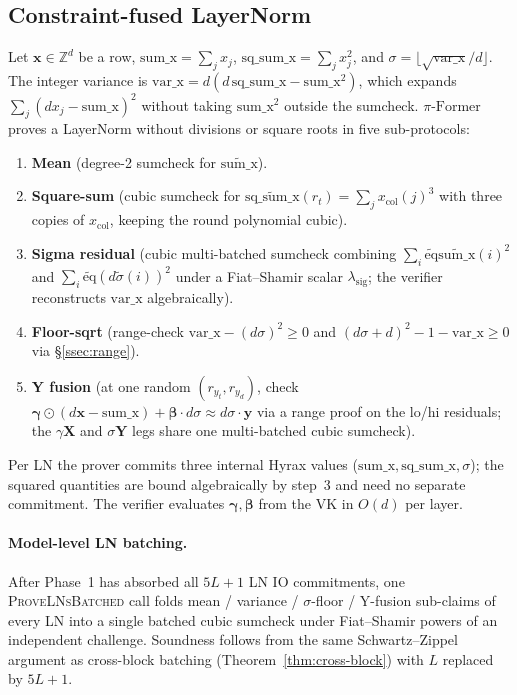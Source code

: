 \documentclass[letterpaper,twocolumn,10pt]{article}
\theoremstyle{remark}
\theoremstyle{definition}
\newcommand{\sys}{\ensuremath{\pi\text{-Former}}}
\newcommand{\ZZ}{\mathbb{Z}}
\newcommand{\bx}{\mathbf{x}}
\newcommand{\by}{\mathbf{y}}
\newcommand{\bX}{\mathbf{X}}
\newcommand{\bY}{\mathbf{Y}}
\newcommand{\bbeta}{\boldsymbol{\beta}}
\newcommand{\bgamma}{\boldsymbol{\gamma}}
\newcommand{\eq}{\widetilde{\mathrm{eq}}}
\begin{document}
\subsection{Constraint-fused LayerNorm}
\label{ssec:ln}
Let $\bx\!\in\!\ZZ^d$ be a row,
$\mathrm{sum\_x}\!=\!\sum_j x_j$,
$\mathrm{sq\_sum\_x}\!=\!\sum_j x_j^2$, and
$\sigma\!=\!\lfloor\sqrt{\mathrm{var\_x}}/d\rfloor$. The integer variance
is $\mathrm{var\_x}\!=\!d(d\,\mathrm{sq\_sum\_x}-\mathrm{sum\_x}^2)$,
which expands $\sum_j(d x_j-\mathrm{sum\_x})^2$ without taking
$\mathrm{sum\_x}^2$ outside the sumcheck. \sys{} proves a LayerNorm
without divisions or square roots in five sub-protocols:
\begin{enumerate}
  \item \textbf{Mean} (degree-2 sumcheck for $\widetilde{\mathrm{sum\_x}}$).
  \item \textbf{Square-sum} (cubic sumcheck for
        $\widetilde{\mathrm{sq\_sum\_x}}(r_t)\!=\!\sum_j x_{\mathrm{col}}(j)^3$
        with three copies of $x_{\mathrm{col}}$, keeping the round
        polynomial cubic).
  \item \textbf{Sigma residual} (cubic multi-batched sumcheck combining
        $\sum_i\eq\widetilde{\mathrm{sum\_x}}(i)^2$ and
        $\sum_i\eq(d\widetilde\sigma(i))^2$ under a Fiat--Shamir scalar
        $\lambda_{\mathrm{sig}}$; the verifier reconstructs
        $\mathrm{var\_x}$ algebraically).
  \item \textbf{Floor-sqrt} (range-check
        $\mathrm{var\_x}\!-\!(d\sigma)^2\!\geq\!0$ and
        $(d\sigma\!+\!d)^2\!-\!1\!-\!\mathrm{var\_x}\!\geq\!0$ via
        \S\ref{ssec:range}).
  \item \textbf{Y fusion} (at one random $(r_{y_t},r_{y_d})$, check
        $\bgamma\!\odot\!(d\bx-\mathrm{sum\_x})+\bbeta\!\cdot\!d\sigma\approx d\sigma\!\cdot\!\by$
        via a range proof on the lo/hi residuals; the $\gamma\bX$ and
        $\sigma\bY$ legs share one multi-batched cubic sumcheck).
\end{enumerate}
Per LN the prover commits three internal Hyrax values
($\mathrm{sum\_x},\mathrm{sq\_sum\_x},\sigma$); the squared quantities
are bound algebraically by step~3 and need no separate commitment. The
verifier evaluates $\bgamma,\bbeta$ from the VK in $O(d)$ per layer.

\paragraph{Model-level LN batching.}
After Phase~1 has absorbed all $5L\!+\!1$ LN IO commitments, one
\textsc{ProveLNsBatched} call folds mean / variance / $\sigma$-floor /
Y-fusion sub-claims of every LN into a single batched cubic sumcheck
under Fiat--Shamir powers of an independent challenge. Soundness
follows from the same Schwartz--Zippel argument as cross-block batching
(Theorem~\ref{thm:cross-block}) with $L$ replaced by $5L+1$.
\end{document}
